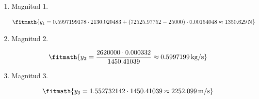 \begin{enumerate}

\item Magnitud 1.

\[\fitmath{y_{1}=0.5997199178\cdot 2130.020483+\left(72525.97752-25000\right)\cdot 0.00154048\approx 1350.629\,\mathrm{N}}\]

\item Magnitud 2.

\[\fitmath{y_{2}=\frac{2620000\cdot 0.000332}{1450.41039}\approx 0.5997199\,\mathrm{kg/s}}\]

\item Magnitud 3.

\[\fitmath{y_{3}=1.552732142\cdot 1450.41039\approx 2252.099\,\mathrm{m/s}}\]

\end{enumerate}
